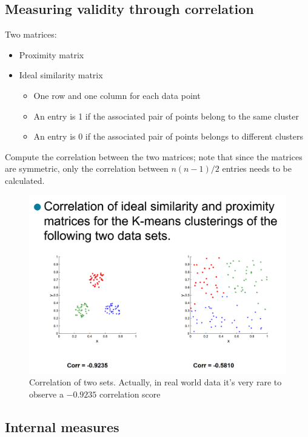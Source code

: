 \subsection{Measuring validity through correlation}

Two matrices:
\begin{itemize}
   \item Proximity matrix
   \item Ideal similarity matrix
   \begin{itemize}
      \item One row and one column for each data point
      \item An entry is 1 if the associated pair of points belong to the same cluster
      \item An entry is 0 if the associated pair of points belongs to different clusters
   \end{itemize}
\end{itemize}

Compute the correlation between the two matrices; note that since the matrices are symmetric, only the correlation between $n(n-1) / 2$ entries needs to be calculated.

\begin{figure}[htbp]
   \centering
   \includegraphics{images/05/correlation.png}
   \caption{Correlation of two sets. Actually, in real world data it's very rare to observe a $-0.9235$ correlation score}
   \label{fig:correlation}
\end{figure}

\subsection{Internal measures}


